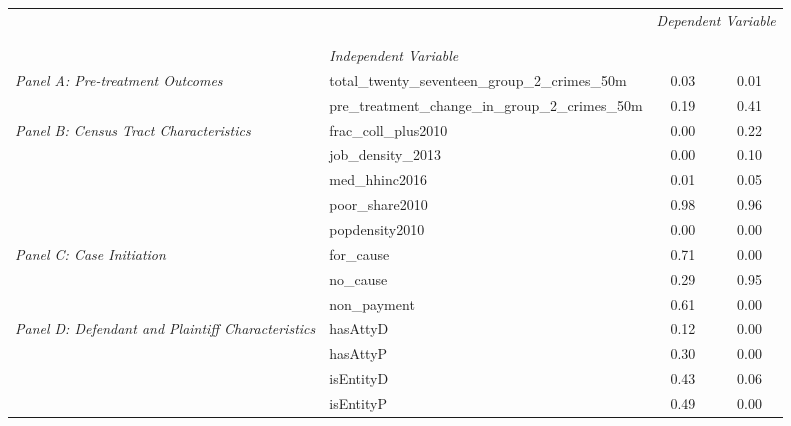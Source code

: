 \begin{tabular}{llcc}
\toprule
 &  & \multicolumn{2}{c}{\textit{Dependent Variable}} \\
\cline{3-4}
\\
 &  &  &  \\
 & \emph{Independent Variable} &  &  \\
\midrule
\multirow[c]{2}{3cm}{\textit{Panel A: Pre-treatment Outcomes}} & total_twenty_seventeen_group_2_crimes_50m & 0.03 & 0.01 \\
 & pre_treatment_change_in_group_2_crimes_50m & 0.19 & 0.41 \\
\cline{1-4}
\multirow[c]{5}{3cm}{\textit{Panel B: Census Tract Characteristics}} & frac_coll_plus2010 & 0.00 & 0.22 \\
 & job_density_2013 & 0.00 & 0.10 \\
 & med_hhinc2016 & 0.01 & 0.05 \\
 & poor_share2010 & 0.98 & 0.96 \\
 & popdensity2010 & 0.00 & 0.00 \\
\cline{1-4}
\multirow[c]{3}{3cm}{\textit{Panel C: Case Initiation}} & for_cause & 0.71 & 0.00 \\
 & no_cause & 0.29 & 0.95 \\
 & non_payment & 0.61 & 0.00 \\
\cline{1-4}
\multirow[c]{4}{3cm}{\textit{Panel D: Defendant and Plaintiff Characteristics}} & hasAttyD & 0.12 & 0.00 \\
 & hasAttyP & 0.30 & 0.00 \\
 & isEntityD & 0.43 & 0.06 \\
 & isEntityP & 0.49 & 0.00 \\
\cline{1-4}
\bottomrule
\end{tabular}
